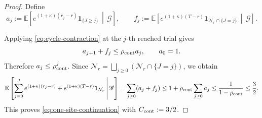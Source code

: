 \documentclass[letterpaper,11pt,reqno]{amsart}
\theoremstyle{definition}
\begin{document}
\begin{proof}
Define
\[
a_j
:=
\mathbb E\left[
 e^{(1+\kappa)(r_j-r)}\mathbf 1_{\{J\ge j\}}
 \,\middle|\,
 \mathscr G
\right],
\qquad
f_j
:=
\mathbb E\left[
 e^{(1+\kappa)(T-r)}
 \mathbf 1_{\mathcal N_r\cap\{J=j\}}
 \,\middle|\,
 \mathscr G
\right].
\]

Applying \eqref{eq:cycle-contraction} at the \(j\)-th reached trial gives
\[
a_{j+1}+f_j\le\rho_{\rm cont}a_j,
\qquad a_0=1.
\]
Therefore \(a_j\le\rho_{\rm cont}^j\). Since $\mathcal N_r
        =\bigsqcup_{j\ge0}
          (\mathcal N_r\cap\{J=j\})$, we obtain
\[
\mathbb E\left[
    \sum_{j=0}^{J}e^{(1+\kappa)(r_j-r)}
    +e^{(1+\kappa)(T-r)}\mathbf 1_{\mathcal N_r}
    \,\middle|\,\mathscr G
\right]
=\sum_{j\ge0}(a_j+f_j)                 \le1+\rho_{\rm cont}\sum_{j\ge0}a_j
\le\frac1{1-\rho_{\rm cont}}
\le\frac32.
\]
This proves \eqref{eq:one-site-continuation} with \(C_{\rm cont}:=3/2\).
\end{proof}
\end{document}
